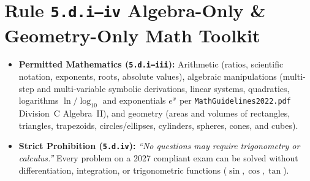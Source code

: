 \section{Rule \texttt{5.d.i--iv} Algebra-Only \& Geometry-Only Math Toolkit}
\label{sec:02.5}

\begin{rulebox}
\begin{itemize}
  \item \textbf{Permitted Mathematics (\texttt{5.d.i--iii}):} Arithmetic (ratios, scientific notation, exponents, roots, absolute values), algebraic manipulations (multi-step and multi-variable symbolic derivations, linear systems, quadratics, logarithms $\ln/\log_{10}$ and exponentials $e^x$ per \texttt{MathGuidelines2022.pdf} Division~C Algebra~II), and geometry (areas and volumes of rectangles, triangles, trapezoids, circles/ellipses, cylinders, spheres, cones, and cubes).
  \item \textbf{Strict Prohibition (\texttt{5.d.iv}):} \emph{``No questions may require trigonometry or calculus.''} Every problem on a 2027 compliant exam can be solved without differentiation, integration, or trigonometric functions ($\sin, \cos, \tan$).
\end{itemize}
\end{rulebox}

